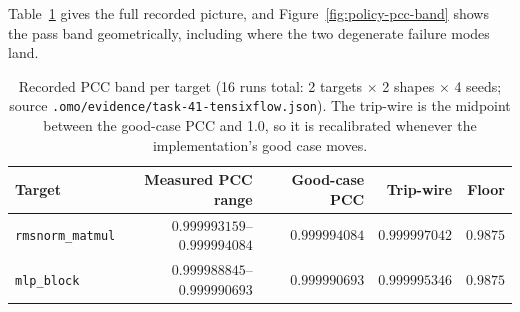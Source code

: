 Table~\ref{tab:policy-nonvacuity} gives the full recorded picture, and
Figure~\ref{fig:policy-pcc-band} shows the pass band geometrically, including where
the two degenerate failure modes land.

\begin{table}[t]
  \centering
  \footnotesize
  \caption{Recorded PCC band per target (16 runs total: 2 targets $\times$ 2
    shapes $\times$ 4 seeds; source \texttt{.omo/evidence/task-41-tensixflow.json}).
    The trip-wire is the midpoint between the good-case PCC and 1.0, so it is
    recalibrated whenever the implementation's good case moves.}
  \label{tab:policy-nonvacuity}
  \begin{tabular}{@{}l r r r r@{}}
    \toprule
    Target & Measured PCC range & Good-case PCC & Trip-wire & Floor \\
    \midrule
    \texttt{rmsnorm\_matmul} & $0.999993159$--$0.999994084$ & $0.999994084$ & $0.999997042$ & $0.9875$ \\
    \texttt{mlp\_block}      & $0.999988845$--$0.999990693$ & $0.999990693$ & $0.999995346$ & $0.9875$ \\
    \bottomrule
  \end{tabular}
\end{table}

